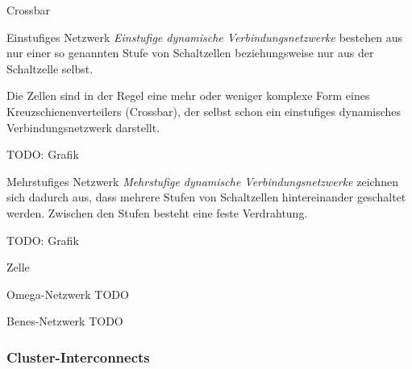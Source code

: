 \begin{defi}{Crossbar}

\end{defi}

\begin{defi}{Einstufiges Netzwerk}
    \emph{Einstufige dynamische Verbindungsnetzwerke} bestehen aus nur einer so genannten Stufe von Schaltzellen beziehungsweise nur aus der Schaltzelle selbst.

    Die Zellen sind in der Regel eine mehr oder weniger komplexe Form eines Kreuzschienenverteilers (Crossbar), der selbst schon ein einstufiges dynamisches Verbindungsnetzwerk darstellt.

    TODO: Grafik
\end{defi}

\begin{defi}{Mehrstufiges Netzwerk}
    \emph{Mehrstufige dynamische Verbindungsnetzwerke} zeichnen sich dadurch aus, dass mehrere Stufen von Schaltzellen hintereinander geschaltet werden.
    Zwischen den Stufen besteht eine feste Verdrahtung.

    TODO: Grafik
\end{defi}

\begin{defi}{Zelle}

\end{defi}

\begin{defi}{Omega-Netzwerk}
    TODO
\end{defi}

\begin{defi}{Benes-Netzwerk}
    TODO
\end{defi}

\subsubsection{Cluster-Interconnects}

